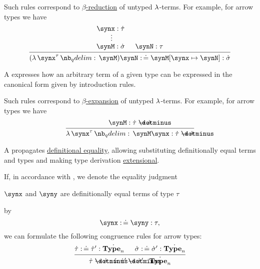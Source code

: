 \begin{remark}
\begin{thmenum}
\begin{thmenum}
      Such rules correspond to \hyperref[def:beta_eta_reduction]{\( \beta \)-reduction} of untyped \( \mathrm{\lambda} \)-terms. For example, for arrow types we have
      \begin{equation*}
        \begin{prooftree}
          \hypo{ \synx: \syn\tau }
          \ellipsis {} { \synM: \syn\sigma }

          \hypo{ \synN: \tau }
          \infer2{ (\qabs {\synx^\tau} \synM) \synN \syncoloneqq \synM[\synx \mapsto \synN]: \syn\sigma }.
        \end{prooftree}
      \end{equation*}

       A  expresses how an arbitrary term of a given type can be expressed in the canonical form given by introduction rules.

      Such rules correspond to \hyperref[def:beta_eta_reduction]{\( \beta \)-expansion} of untyped \( \mathrm{\lambda} \)-terms. For example, for arrow types we have
      \begin{equation*}
        \begin{prooftree}
          \hypo{ \synM: \syn\tau \synimplies \syn\sigma }
          \infer1{ \qabs {\synx^\tau} \synM \synx: \syn\tau \synimplies \syn\sigma }.
        \end{prooftree}
      \end{equation*}

       A  propagates \hyperref[con:equality]{definitional equality}, allowing substituting definitionally equal terms and types and making type derivation \hyperref[con:extensionality]{extensional}.

      If, in accordance with , we denote the equality judgment
      \begin{center}
        \( \synx \) and \( \syny \) are definitionally equal terms of type \( \tau \)
      \end{center}
      by
      \begin{equation*}
        \synx \syncoloneqq \syny: \tau,
      \end{equation*}
      we can formulate the following congruence rules for arrow types:
      \begin{equation*}
        \begin{prooftree}
          \hypo{ \syn\tau \syncoloneqq \syn\tau': \syn{\op*{Type}_n} }
          \hypo{ \syn\sigma \syncoloneqq \syn\sigma': \syn{\op*{Type}_n} }
          \infer2{ \syn\tau \synimplies \syn\sigma \syncoloneqq \syn\tau' \synimplies \syn\sigma': \syn{\op*{Type}_n} }
        \end{prooftree}
      \end{equation*}


\end{thmenum}
\end{thmenum}
\end{remark}
